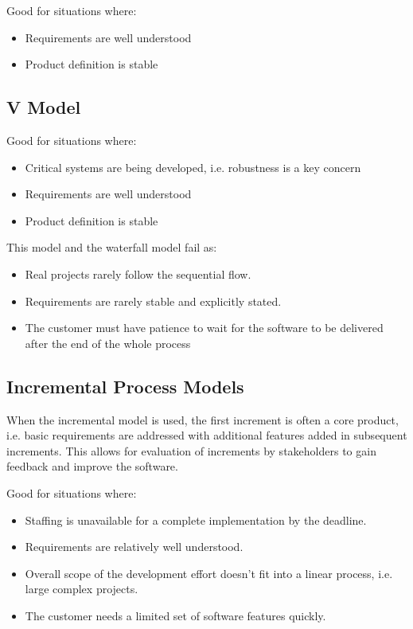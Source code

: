 \documentclass[12pt letter]{report}
\begin{document}
Good for situations where:
\begin{itemize}
  \item  Requirements are well understood
  \item Product definition is stable
\end{itemize}


\subsection{V Model}

Good for situations where:
\begin{itemize}
  \item Critical systems are being developed, i.e. robustness is a key concern
  \item  Requirements are well understood
  \item  Product definition is stable
\end{itemize}

This model and the waterfall model fail as:
\begin{itemize}
  \item Real projects rarely follow the sequential flow.
  \item Requirements are rarely stable and explicitly stated.
  \item The customer must have patience to wait for the software to be delivered after the end of the whole process
\end{itemize}

\subsection{Incremental Process Models}
When the incremental model is used, the first increment is often a core product, i.e. basic requirements are addressed with additional features added in subsequent increments. This allows for evaluation of increments by stakeholders to gain feedback and improve the software.

Good for situations where:
\begin{itemize}
  \item Staffing is unavailable for a complete implementation by the deadline.
  \item Requirements are relatively well understood.
  \item Overall scope of the development effort doesn't fit into a linear process, i.e. large complex projects.
  \item The customer needs a limited set of software features quickly.
\end{itemize}
\end{document}
